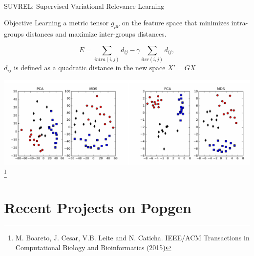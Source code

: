 \documentclass[10pt]{beamer}
\begin{document}
\begin{frame}{SUVREL: Supervised Variational Relevance Learning}

  \begin{alertblock}{Objective}
  Learning a metric tensor $g_{\mu\nu}$ on the feature space that minimizes
  intra-groups distances and maximize inter-groups distances. 
	\end{alertblock}
  \[
    E = \sum_{intra(i,j)} d_{ij} - \gamma \sum_{iter(i,j)} d_{ij}, 
  \]
  $d_{ij}$ is defined as a quadratic distance in the new space $X' = G X$ 

  \includegraphics[width=\textwidth]{./Figures/suvrel_image.png}
  \let\thefootnote\relax\footnote{M. Boareto, J. Cesar, V.B. Leite and
    N. Caticha. IEEE/ACM Transactions in Computational Biology and
    Bioinformatics (2015)}
\end{frame}

\section{Recent Projects on Popgen}
\end{document}
